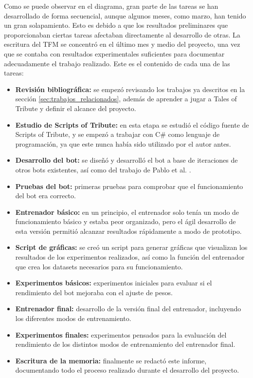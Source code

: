Como se puede observar en el diagrama, gran parte de las tareas se han desarrollado de forma secuencial, aunque algunos meses, como marzo, han tenido un gran solapamiento. Esto es debido a que los resultados preliminares que proporcionaban ciertas tareas afectaban directamente al desarrollo de otras. La escritura del TFM se concentró en el último mes y medio del proyecto, una vez que se contaba con resultados experimentales suficientes para documentar adecuadamente el trabajo realizado. Este es el contenido de cada una de las tareas:
\begin{itemize}
	\item \textbf{Revisión bibliográfica:} se empezó revisando los trabajos ya descritos en la sección \ref{sec:trabajos_relacionados}, además de aprender a jugar a Tales of Tribute y definir el alcance del proyecto.
	\item \textbf{Estudio de Scripts of Tribute:} en esta etapa se estudió el código fuente de Scripts of Tribute, y se empezó a trabajar con C\# como lenguaje de programación, ya que este nunca había sido utilizado por el autor antes.
	\item \textbf{Desarrollo del bot:} se diseñó y desarrolló el bot a base de iteraciones de otros bots existentes, así como del trabajo de Pablo et al. \cite{garcia-sanchez_optimizing_2020}.
	\item \textbf{Pruebas del bot:} primeras pruebas para comprobar que el funcionamiento del bot era correcto.
	\item \textbf{Entrenador básico:} en un principio, el entrenador solo tenía un modo de funcionamiento básico y estaba peor organizado, pero el ágil desarrollo de esta versión permitió alcanzar resultados rápidamente a modo de prototipo.
	\item \textbf{Script de gráficas:} se creó un script para generar gráficas que visualizan los resultados de los experimentos realizados, así como la función del entrenador que crea los datasets necesarios para su funcionamiento.
	\item \textbf{Experimentos básicos:} experimentos iniciales para evaluar si el rendimiento del bot mejoraba con el ajuste de pesos.
	\item \textbf{Entrenador final:} desarrollo de la versión final del entrenador, incluyendo los diferentes modos de entrenamiento.
	\item \textbf{Experimentos finales:} experimentos pensados para la evaluación del rendimiento de los distintos modos de entrenamiento del entrenador final.
	\item \textbf{Escritura de la memoria:} finalmente se redactó este informe, documentando todo el proceso realizado durante el desarrollo del proyecto.
\end{itemize}